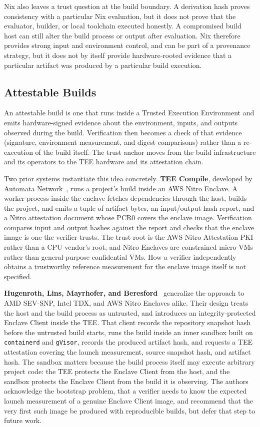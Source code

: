 \documentclass[11pt]{article}
\begin{document}
Nix also leaves a trust question at the build boundary. A derivation hash proves consistency with a particular Nix evaluation, but it does not prove that the evaluator, builder, or local toolchain executed honestly. A compromised build host can still alter the build process or output after evaluation. Nix therefore provides strong input and environment control, and can be part of a provenance strategy, but it does not by itself provide hardware-rooted evidence that a particular artifact was produced by a particular build execution.

\subsection{Attestable Builds}

An attestable build is one that runs inside a Trusted Execution Environment and emits hardware-signed evidence about the environment, inputs, and outputs observed during the build. Verification then becomes a check of that evidence (signature, environment measurement, and digest comparisons) rather than a re-execution of the build itself. The trust anchor moves from the build infrastructure and its operators to the TEE hardware and its attestation chain.

Two prior systems instantiate this idea concretely. \textbf{TEE Compile}, developed by Automata Network~\cite{ref:tee-compile}, runs a project's build inside an AWS Nitro Enclave. A worker process inside the enclave fetches dependencies through the host, builds the project, and emits a tuple of artifact bytes, an input/output hash report, and a Nitro attestation document whose PCR0 covers the enclave image. Verification compares input and output hashes against the report and checks that the enclave image is one the verifier trusts. The trust root is the AWS Nitro Attestation PKI rather than a CPU vendor's root, and Nitro Enclaves are constrained micro-VMs rather than general-purpose confidential VMs. How a verifier independently obtains a trustworthy reference measurement for the enclave image itself is not specified.

\textbf{Hugenroth, Lins, Mayrhofer, and Beresford}~\cite{ref:hugenroth} generalize the approach to AMD SEV-SNP, Intel TDX, and AWS Nitro Enclaves alike. Their design treats the host and the build process as untrusted, and introduces an integrity-protected Enclave Client inside the TEE. That client records the repository snapshot hash before the untrusted build starts, runs the build inside an inner sandbox built on \texttt{containerd} and \texttt{gVisor}, records the produced artifact hash, and requests a TEE attestation covering the launch measurement, source snapshot hash, and artifact hash. The sandbox matters because the build process itself may execute arbitrary project code: the TEE protects the Enclave Client from the host, and the sandbox protects the Enclave Client from the build it is observing. The authors acknowledge the bootstrap problem, that a verifier needs to know the expected launch measurement of a genuine Enclave Client image, and recommend that the very first such image be produced with reproducible builds, but defer that step to future work.
\end{document}
